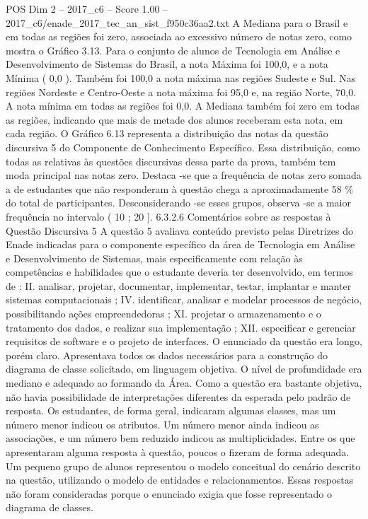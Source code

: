 \begin{textsample}{POS Dim 2 – 2017\_c6 – Score 1.00 – 2017\_c6/enade\_2017\_tec\_an\_sist\_f950c36aa2.txt}
A Mediana para o Brasil e em todas as regiões foi zero, associada ao excessivo número de notas zero, como mostra o Gráfico 3.13.
Para o conjunto de alunos de Tecnologia em Análise e Desenvolvimento de Sistemas do Brasil, a nota Máxima foi 100,0, e a nota Mínima ( 0,0 ).
Também foi 100,0 a nota máxima nas regiões Sudeste e Sul.
Nas regiões Nordeste e Centro-Oeste a nota máxima foi 95,0 e, na região Norte, 70,0.
A nota mínima em todas as regiões foi 0,0.
A Mediana também foi zero em todas as regiões, indicando que mais de metade dos alunos receberam esta nota, em cada região.
O Gráfico 6.13 representa a distribuição das notas da questão discursiva 5 do Componente de Conhecimento Específico.
Essa distribuição, como todas as relativas às questões discursivas dessa parte da prova, também tem moda principal nas notas zero.
Destaca -se que a frequência de notas zero somada a de estudantes que não responderam à questão chega a aproximadamente 58 \% do total de participantes.
Desconsiderando -se esses grupos, observa -se a maior frequência no intervalo ( 10 ; 20 ]. 6.3.2.6 Comentários sobre as respostas à Questão Discursiva 5 A questão 5 avaliava conteúdo previsto pelas Diretrizes do Enade indicadas para o componente específico da área de Tecnologia em Análise e Desenvolvimento de Sistemas, mais especificamente com relação às competências e habilidades que o estudante deveria ter desenvolvido, em termos de : II. analisar, projetar, documentar, implementar, testar, implantar e manter sistemas computacionais ; IV. identificar, analisar e modelar processos de negócio, possibilitando ações empreendedoras ; XI. projetar o armazenamento e o tratamento dos dados, e realizar sua implementação ; XII. especificar e gerenciar requisitos de software e o projeto de interfaces.
O enunciado da questão era longo, porém claro.
Apresentava todos os dados necessários para a construção do diagrama de classe solicitado, em linguagem objetiva.
O nível de profundidade era mediano e adequado ao formando da Área.
Como a questão era bastante objetiva, não havia possibilidade de interpretações diferentes da esperada pelo padrão de resposta.
Os estudantes, de forma geral, indicaram algumas classes, mas um número menor indicou os atributos.
Um número menor ainda indicou as associações, e um número bem reduzido indicou as multiplicidades.
Entre os que apresentaram alguma resposta à questão, poucos o fizeram de forma adequada.
Um pequeno grupo de alunos representou o modelo conceitual do cenário descrito na questão, utilizando o modelo de entidades e relacionamentos.
Essas respostas não foram consideradas porque o enunciado exigia que fosse representado o diagrama de classes.

\end{textsample}
